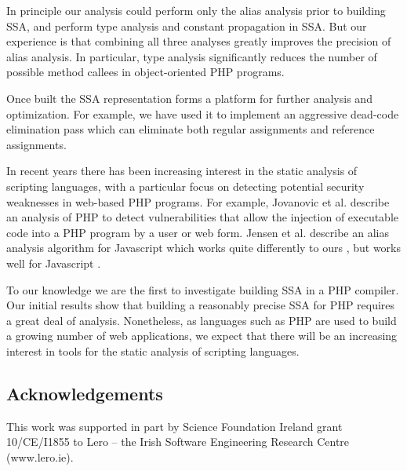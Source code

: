 In principle our analysis could perform only the alias analysis prior
to building SSA, and perform type analysis and constant propagation in
SSA. But our experience is that combining all three analyses greatly
improves the precision of alias analysis.  In particular, type
analysis significantly reduces the number of possible method callees
in object-oriented PHP programs.


Once built the SSA representation forms a platform for further
analysis and optimization. For example, we have used it to implement
an aggressive dead-code elimination pass which can eliminate both
regular assignments and reference assignments.

In recent years there has been increasing interest in the static
analysis of scripting languages, with a particular focus on detecting
potential security weaknesses in web-based PHP programs. For example,
Jovanovic et al. \cite{Jovanovic06pixy:a} describe an analysis of PHP
to detect vulnerabilities that allow the injection of executable code
into a PHP program by a user or web form. Jensen et al.  describe an
alias analysis algorithm for Javascript which works quite differently
to ours \cite{Biggar2010}, but works well for Javascript
\cite{Jensen+2009}.

To our knowledge we are the first to investigate building SSA in a PHP
compiler. Our initial results show that building a reasonably precise
SSA for PHP requires a great deal of analysis. Nonetheless, as
languages such as PHP are used to build a growing number of web
applications, we expect that there will be an increasing interest in
tools for the static analysis of scripting languages.

\subsection*{Acknowledgements}
This work was supported in part by Science Foundation Ireland
grant 10/CE/I1855 to Lero -- the Irish Software Engineering
Research Centre (www.lero.ie).



